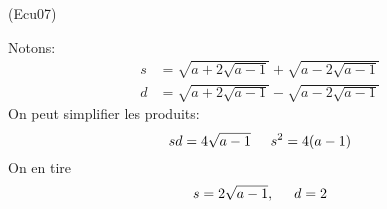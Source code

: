\begin{tiny}(Ecu07)\end{tiny} Notons:
\begin{align*}
  s &= \sqrt{a+2\sqrt{a-1}} + \sqrt{a-2\sqrt{a-1}} \\
  d &= \sqrt{a+2\sqrt{a-1}} - \sqrt{a-2\sqrt{a-1}} 
\end{align*}
On peut simplifier les produits:
\begin{displaymath}
  sd = 4\sqrt{a-1}\hspace{0.5cm} s^2 = 4(a-1)
\end{displaymath}
On en tire
\begin{displaymath}
  s = 2\sqrt{a-1},\hspace{0.5cm} d = 2
\end{displaymath}
